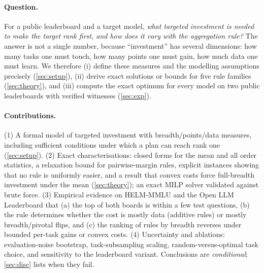 \documentclass{article}
\theoremstyle{plain}
\theoremstyle{definition}
\theoremstyle{remark}
\begin{document}
\paragraph{Question.}
For a public leaderboard and a target model, \emph{what targeted investment is needed to make the target rank first, and how does it vary with the aggregation rule?}
The answer is not a single number, because ``investment'' has several dimensions: how many tasks one must touch, how many points one must gain, how much data one must learn.
We therefore (i) define these measures and the modelling assumptions precisely (\cref{sec:setup}), (ii) derive exact solutions or bounds for five rule families (\cref{sec:theory}), and (iii) compute the exact optimum for every model on two public leaderboards with verified witnesses (\cref{sec:exp}).

\paragraph{Contributions.}
(1) A formal model of targeted investment with breadth/points/data measures, including sufficient conditions under which a plan can reach rank one (\cref{sec:setup}).
(2) Exact characterisations: closed forms for the mean and all order statistics, a relaxation bound for pairwise-margin rules, explicit instances showing that no rule is uniformly easier, and a result that convex costs force full-breadth investment under the mean (\cref{sec:theory}); an exact MILP solver validated against brute force.
(3) Empirical evidence on HELM-MMLU and the Open LLM Leaderboard that (a) the top of both boards is within a few test questions, (b) the rule determines whether the cost is mostly data (additive rules) or mostly breadth/pivotal flips, and (c) the ranking of rules by breadth reverses under bounded per-task gains or convex costs.
(4) Uncertainty and ablations: evaluation-noise bootstrap, task-subsampling scaling, random-versus-optimal task choice, and sensitivity to the leaderboard variant.
Conclusions are \emph{conditional}; \cref{sec:disc} lists when they fail.
\end{document}
